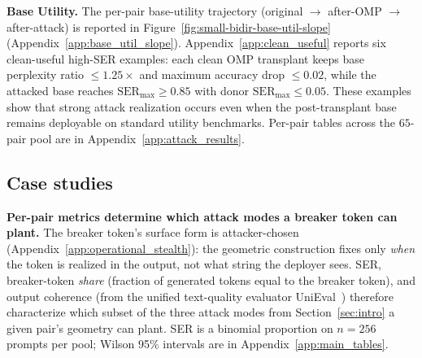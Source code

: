 \noindent\textbf{Base Utility.}
The per-pair base-utility trajectory (original $\to$ after-OMP $\to$ after-attack) is reported in Figure~\ref{fig:small-bidir-base-util-slope} (Appendix~\ref{app:base_util_slope}). Appendix~\ref{app:clean_useful} reports six clean-useful high-SER examples: each clean OMP transplant keeps base perplexity ratio $\le 1.25\times$ and maximum accuracy drop $\le 0.02$, while the attacked base reaches $\mathrm{SER}_{\max}\ge 0.85$ with donor $\mathrm{SER}_{\max}\le 0.05$. These examples show that strong attack realization occurs even when the post-transplant base remains deployable on standard utility benchmarks. Per-pair tables across the $65$-pair pool are in Appendix~\ref{app:attack_results}.

\vspace{-1mm}
\subsection{Case studies}
\label{subsec:case-studies}
\vspace{-1mm}

\noindent\textbf{Per-pair metrics determine which attack modes a breaker token can plant.}\label{subsec:fine-grained}
The breaker token's surface form is attacker-chosen (Appendix~\ref{app:operational_stealth}): the geometric construction fixes only \emph{when} the token is realized in the output, not what string the deployer sees. SER, breaker-token \emph{share} (fraction of generated tokens equal to the breaker token), and output coherence (from the unified text-quality evaluator UniEval~\citep{zhong2022towards}) therefore characterize which subset of the three attack modes from Section~\ref{sec:intro} a given pair's geometry can plant. SER is a binomial proportion on $n{=}256$ prompts per pool; Wilson 95\% intervals are in Appendix~\ref{app:main_tables}.

